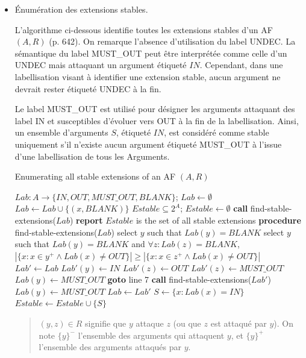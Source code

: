 \documentclass{rapportECL}
\begin{document}
\begin{itemize}
    \item Énumération des extensions stables.
    
	L'algorithme ci-dessous identifie toutes les extensions stables d’un AF $(A, R)$ \cite{c} (p. 642). %
	On remarque l'absence d'utilisation du label {UNDEC}. La sémantique du label {MUST\_OUT} peut être interprétée comme celle 
	d'un {UNDEC} mais attaquant un argument étiqueté \({IN}\). 
	Cependant, dans une labellisation visant à identifier une extension stable, aucun argument ne devrait rester étiqueté {UNDEC} à 
	la fin. 

	Le label {MUST\_OUT} est utilisé pour désigner les arguments attaquant des label {IN} et susceptibles d'évoluer 
	vers {OUT} à la fin de la labellisation. Ainsi, un ensemble d'arguments \( S \), étiqueté \({IN}\), est 
	considéré comme stable uniquement s'il n'existe aucun argument étiqueté {MUST\_OUT} à l'issue d'une labellisation de tous les Arguments.

	\begin{algorithm}
		\caption{Enumerating all stable extensions of an AF $(A, R)$}
		\begin{algorithmic}[1]
			\STATE $Lab : A \to \{IN, OUT,  MUST\_OUT, BLANK\}$; $Lab \gets \emptyset$
				\STATE $Lab \gets Lab \cup \{(x, BLANK)\}$
			\ENDFOR
			\STATE $Estable \subseteq 2^A$; $Estable \gets \emptyset$
			\STATE \textbf{call} find-stable-extensions($Lab$)
			\STATE \textbf{report} $Estable$ is the set of all stable extensions
			\STATE \textbf{procedure} find-stable-extensions($Lab$)
					\STATE select $y$ such that $Lab(y) = BLANK$
				\ELSE
					\STATE select $y$ such that $Lab(y) = BLANK$ and $\forall z : Lab(z) = BLANK$, 
					\STATE $\left| \{x : x \in {y}^+ \land Lab(x) \neq OUT \} \right| \geq \left| \{x : x \in {z}^+ \land Lab(x) \neq OUT \} \right|$
				\ENDIF
				\STATE $Lab' \gets Lab$
				\STATE $Lab'(y) \gets IN$
					\STATE $Lab'(z) \gets OUT$
				\ENDFOR
						\STATE $Lab'(z) \gets  MUST\_OUT$
					\ENDIF
						\STATE $Lab(y) \gets  MUST\_OUT$
					\ENDIF
				\ENDFOR
				\STATE \textbf{goto} line 7
				\STATE \textbf{call} find-stable-extensions($Lab'$)
					\STATE $Lab(y) \gets  MUST\_OUT$
				\ELSE
					\STATE $Lab \gets Lab'$
				\ENDIF
					\STATE $S \gets \{x : Lab(x) = IN\}$
					\STATE $Estable \gets Estable \cup \{S\}$
				\ENDIF
			\ENDWHILE
		\end{algorithmic}
	\end{algorithm}
	\begin{quote}
$(y, z) \in R$ signifie que $y$ attaque $z$ (ou que $z$ est attaqué par $y$).  
On note $\{y\}^-$ l'ensemble des arguments qui attaquent $y$,  
et $\{y\}^+$ l'ensemble des arguments attaqués par $y$.  
	\end{quote}	



\end{itemize}
\end{document}
